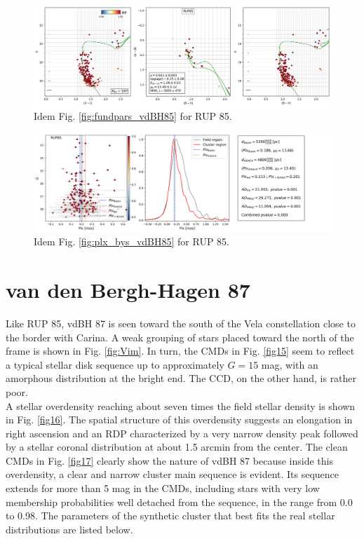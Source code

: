 \documentclass[draft]{aa}
\begin{document}
\begin{figure}[ht]
    \centering
    \includegraphics[width=\hsize]{../figs/cmds_rup85.png}
    \caption{Idem Fig. \ref{fig:fundpars_vdBH85} for RUP 85.}
    \label{fig9}
\end{figure}

\begin{figure}[ht]
    \centering
    \includegraphics[width=\hsize]{../figs/plx_RUP85.png}
    \caption{Idem Fig. \ref{fig:plx_bys_vdBH85} for RUP 85.}
    \label{fig10}
\end{figure}





\section{van den Bergh-Hagen 87}

Like RUP 85, vdBH 87 is seen toward the south of the Vela constellation close to
the border with Carina. A weak grouping of stars placed toward the north of
the frame is shown in Fig. \ref{fig:Vim}. In turn, the CMDs in Fig. \ref{fig15}
seem to reflect a typical stellar disk sequence up to approximately $G=15$ mag,
with an amorphous distribution at the bright end. The CCD, on the other
hand, is rather poor.\\

A stellar overdensity reaching $\text{about seven}$ times the field stellar density is
shown in Fig. \ref{fig16}. The spatial structure of this overdensity suggests an
elongation in right ascension and an RDP characterized by a very narrow density
peak followed by a stellar coronal distribution at about 1.5 arcmin from the
center.
The clean CMDs in Fig. \ref{fig17} clearly show the nature of vdBH 87
because inside this overdensity, a clear and narrow cluster main
sequence is evident. Its sequence extends for more than 5 mag in the
CMDs, including stars with very low membership probabilities well detached
from the sequence, in the range from 0.0 to 0.98. The parameters of the
synthetic cluster that best fits the real stellar distributions are listed below.
\end{document}
